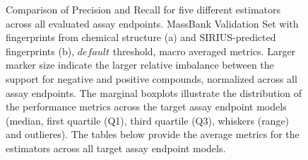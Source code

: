 \begin{figure}
\begin{subfigure}[b]{0.495\textwidth}
      \caption{}
      \label{fig:hitcall_classification_Feature_Selection_XGBClassifier_mb_val_sirius_default_macro_avg}
  \end{subfigure}
  \caption{Comparison of Precision and Recall for five different estimators across all evaluated assay endpoints. MassBank Validation Set with fingerprints from chemical structure (a) and SIRIUS-predicted fingerprints (b), $default$ threshold, macro averaged metrics. Larger marker size indicate the larger relative imbalance between the support for negative and positive compounds, normalized across all assay endpoints. The marginal boxplots illustrate the distribution of the performance metrics across the target assay endpoint models (median, first quartile (Q1), third quartile (Q3), whiskers (range) and outlieres). The tables below provide the average metrics for the estimators across all target assay endpoint models.}
  \label{fig:hitcall_classification_Feature_Selection_XGBClassifier_mb_val_default_macro_avg}
\end{figure}





\newpage

